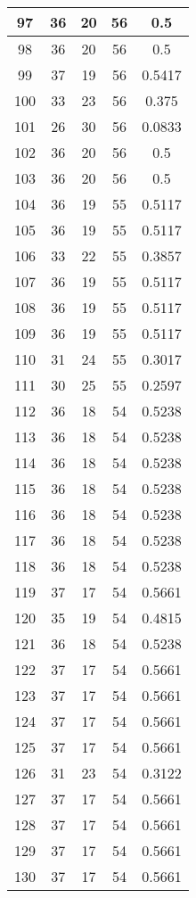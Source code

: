 \documentclass[letterpaper, 12pt]{article}
\begin{document}
\begin{longtable}{|c|c|c|c|c|}
\hline
97 & 36 & 20 & 56 & 0.5 \\
\hline
98 & 36 & 20 & 56 & 0.5 \\
\hline
99 & 37 & 19 & 56 & 0.5417 \\
\hline
100 & 33 & 23 & 56 & 0.375 \\
\hline
101 & 26 & 30 & 56 & 0.0833 \\
\hline
102 & 36 & 20 & 56 & 0.5 \\
\hline
103 & 36 & 20 & 56 & 0.5 \\
\hline
104 & 36 & 19 & 55 & 0.5117 \\
\hline
105 & 36 & 19 & 55 & 0.5117 \\
\hline
106 & 33 & 22 & 55 & 0.3857 \\
\hline
107 & 36 & 19 & 55 & 0.5117 \\
\hline
108 & 36 & 19 & 55 & 0.5117 \\
\hline
109 & 36 & 19 & 55 & 0.5117 \\
\hline
110 & 31 & 24 & 55 & 0.3017 \\
\hline
111 & 30 & 25 & 55 & 0.2597 \\
\hline
112 & 36 & 18 & 54 & 0.5238 \\
\hline
113 & 36 & 18 & 54 & 0.5238 \\
\hline
114 & 36 & 18 & 54 & 0.5238 \\
\hline
115 & 36 & 18 & 54 & 0.5238 \\
\hline
116 & 36 & 18 & 54 & 0.5238 \\
\hline
117 & 36 & 18 & 54 & 0.5238 \\
\hline
118 & 36 & 18 & 54 & 0.5238 \\
\hline
119 & 37 & 17 & 54 & 0.5661 \\
\hline
120 & 35 & 19 & 54 & 0.4815 \\
\hline
121 & 36 & 18 & 54 & 0.5238 \\
\hline
122 & 37 & 17 & 54 & 0.5661 \\
\hline
123 & 37 & 17 & 54 & 0.5661 \\
\hline
124 & 37 & 17 & 54 & 0.5661 \\
\hline
125 & 37 & 17 & 54 & 0.5661 \\
\hline
126 & 31 & 23 & 54 & 0.3122 \\
\hline
127 & 37 & 17 & 54 & 0.5661 \\
\hline
128 & 37 & 17 & 54 & 0.5661 \\
\hline
129 & 37 & 17 & 54 & 0.5661 \\
\hline
130 & 37 & 17 & 54 & 0.5661 \\

\end{longtable}
\end{document}
